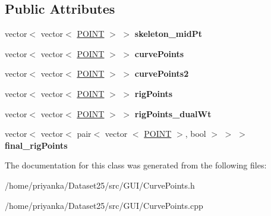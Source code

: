 \subsection*{\-Public \-Attributes}
\begin{DoxyCompactItemize}
\item 
\hypertarget{classCurvePoints_a82f3109e4d16251c4f1111f56701c861}{vector$<$ vector$<$ \hyperlink{structPOINT}{\-P\-O\-I\-N\-T} $>$ $>$ {\bfseries skeleton\-\_\-mid\-Pt}}\label{classCurvePoints_a82f3109e4d16251c4f1111f56701c861}

\item 
\hypertarget{classCurvePoints_aa9adedc1a7b074e9092ffa8e088aaa1f}{vector$<$ vector$<$ \hyperlink{structPOINT}{\-P\-O\-I\-N\-T} $>$ $>$ {\bfseries curve\-Points}}\label{classCurvePoints_aa9adedc1a7b074e9092ffa8e088aaa1f}

\item 
\hypertarget{classCurvePoints_a7a0e65db4b98a030d9468269e7928f50}{vector$<$ vector$<$ \hyperlink{structPOINT}{\-P\-O\-I\-N\-T} $>$ $>$ {\bfseries curve\-Points2}}\label{classCurvePoints_a7a0e65db4b98a030d9468269e7928f50}

\item 
\hypertarget{classCurvePoints_a53f5fe4fe16b4a2bb4c3bb045a7f64a3}{vector$<$ vector$<$ \hyperlink{structPOINT}{\-P\-O\-I\-N\-T} $>$ $>$ {\bfseries rig\-Points}}\label{classCurvePoints_a53f5fe4fe16b4a2bb4c3bb045a7f64a3}

\item 
\hypertarget{classCurvePoints_ac689fabd6c2d26c074fba5078946d8f6}{vector$<$ vector$<$ \hyperlink{structPOINT}{\-P\-O\-I\-N\-T} $>$ $>$ {\bfseries rig\-Points\-\_\-dual\-Wt}}\label{classCurvePoints_ac689fabd6c2d26c074fba5078946d8f6}

\item 
\hypertarget{classCurvePoints_accc80a4b1d563df4709210c4196c3f8d}{vector$<$ vector$<$ pair$<$ vector\*
$<$ \hyperlink{structPOINT}{\-P\-O\-I\-N\-T} $>$, bool $>$ $>$ $>$ {\bfseries final\-\_\-rig\-Points}}\label{classCurvePoints_accc80a4b1d563df4709210c4196c3f8d}

\end{DoxyCompactItemize}


\-The documentation for this class was generated from the following files\-:\begin{DoxyCompactItemize}
\item 
/home/priyanka/\-Dataset25/src/\-G\-U\-I/\-Curve\-Points.\-h\item 
/home/priyanka/\-Dataset25/src/\-G\-U\-I/\-Curve\-Points.\-cpp\end{DoxyCompactItemize}

